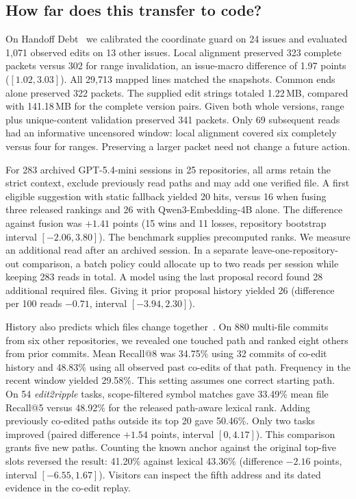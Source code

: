 \documentclass[conference]{IEEEtran}
\begin{document}
\subsection{How far does this transfer to code?}
On Handoff Debt~\cite{handoff} we calibrated the coordinate guard on 24 issues and evaluated 1,071 observed edits on 13 other issues. Local alignment preserved 323 complete packets versus 302 for range invalidation, an issue-macro difference of 1.97 points ($[1.02,3.03]$). All 29,713 mapped lines matched the snapshots. Common ends alone preserved 322 packets. The supplied edit strings totaled 1.22\,MB, compared with 141.18\,MB for the complete version pairs. Given both whole versions, range plus unique-content validation preserved 341 packets. Only 69 subsequent reads had an informative uncensored window: local alignment covered six completely versus four for ranges. Preserving a larger packet need not change a future action.

\balance
For 283 archived GPT-5.4-mini sessions in 25 repositories, all arms retain the strict context, exclude previously read paths and may add one verified file. A first eligible suggestion with static fallback yielded 20 hits, versus 16 when fusing three released rankings and 26 with Qwen3-Embedding-4B alone. The difference against fusion was $+1.41$ points (15 wins and 11 losses, repository bootstrap interval $[-2.06,3.80]$). The benchmark supplies precomputed ranks. We measure an additional read after an archived session. In a separate leave-one-repository-out comparison, a batch policy could allocate up to two reads per session while keeping 283 reads in total. A model using the last proposal record found 28 additional required files. Giving it prior proposal history yielded 26 (difference per 100 reads $-0.71$, interval $[-3.94,2.30]$).

History also predicts which files change together~\cite{zimmermann}. On 880 multi-file commits from six other repositories, we revealed one touched path and ranked eight others from prior commits. Mean Recall@8 was 34.75\% using 32 commits of co-edit history and 48.83\% using all observed past co-edits of that path. Frequency in the recent window yielded 29.58\%. This setting assumes one correct starting path. On 54 \emph{edit2ripple} tasks, scope-filtered symbol matches gave 33.49\% mean file Recall@5 versus 48.92\% for the released path-aware lexical rank. Adding previously co-edited paths outside its top 20 gave 50.46\%. Only two tasks improved (paired difference $+1.54$ points, interval $[0,4.17]$). This comparison grants five new paths. Counting the known anchor against the original top-five slots reversed the result: 41.20\% against lexical 43.36\% (difference $-2.16$ points, interval $[-6.55,1.67]$). Visitors can inspect the fifth address and its dated evidence in the co-edit replay.
\end{document}
